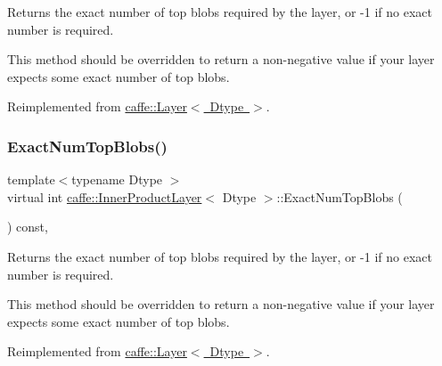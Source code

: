 Returns the exact number of top blobs required by the layer, or -\/1 if no exact number is required. 

This method should be overridden to return a non-\/negative value if your layer expects some exact number of top blobs. 

Reimplemented from \mbox{\hyperlink{classcaffe_1_1_layer_a64e2ca72c719e4b2f1f9216ccfb0d37f}{caffe\+::\+Layer$<$ Dtype $>$}}.

\mbox{\label{classcaffe_1_1_inner_product_layer_a652d8a5b07b72938a81f50305c1a8ee1}} 
\subsubsection{\texorpdfstring{Exact\+Num\+Top\+Blobs()}{ExactNumTopBlobs()}\hspace{0.1cm}{\footnotesize\ttfamily [2/2]}}
{\footnotesize\ttfamily template$<$typename Dtype $>$ \\
virtual int \mbox{\hyperlink{classcaffe_1_1_inner_product_layer}{caffe\+::\+Inner\+Product\+Layer}}$<$ Dtype $>$\+::Exact\+Num\+Top\+Blobs (\begin{DoxyParamCaption}{ }\end{DoxyParamCaption}) const\hspace{0.3cm}{\ttfamily [inline]}, {\ttfamily [virtual]}}



Returns the exact number of top blobs required by the layer, or -\/1 if no exact number is required. 

This method should be overridden to return a non-\/negative value if your layer expects some exact number of top blobs. 

Reimplemented from \mbox{\hyperlink{classcaffe_1_1_layer_a64e2ca72c719e4b2f1f9216ccfb0d37f}{caffe\+::\+Layer$<$ Dtype $>$}}.

\mbox{\label{classcaffe_1_1_inner_product_layer_a4adc29913343ddec1813f3a899e449cc}} 
